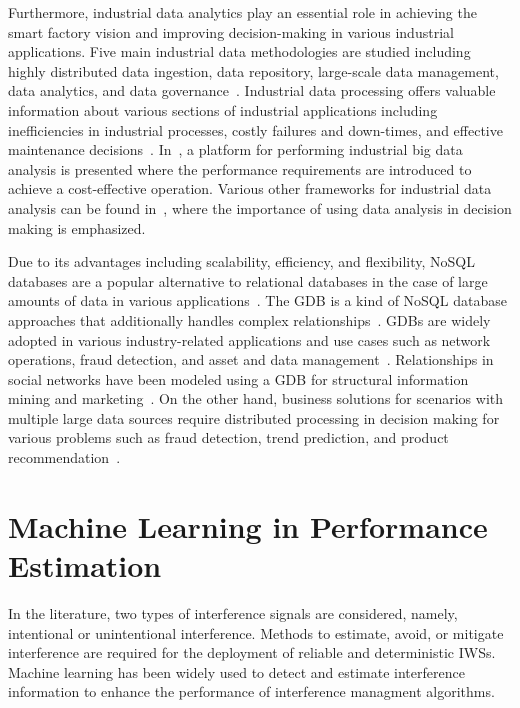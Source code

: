 Furthermore, industrial data analytics play an essential role in achieving the smart factory vision and improving decision-making in various industrial applications. Five main industrial data methodologies are studied including highly distributed data ingestion, data repository, large-scale data management, data analytics, and data governance~\cite{DBLP:journals/corr/abs-1807-01016}. Industrial data processing offers valuable information about various sections of industrial applications including inefficiencies in industrial processes, costly failures and down-times, and effective maintenance decisions~\cite{JLee}. In~\cite{4}, a platform for performing industrial big data analysis is presented where the performance requirements are introduced to achieve a cost-effective operation. Various other frameworks for industrial data analysis can be found in~\cite{5,6}, where the importance of using data analysis in decision making is emphasized.

Due to its advantages including scalability, efficiency, and flexibility, NoSQL databases are a popular alternative to relational databases in the case of large amounts of data in various applications~\cite{doi:10.1108/17440081311316398}. The GDB is a kind of NoSQL database approaches that additionally handles complex relationships~\cite{8123475}. GDBs are widely adopted in various industry-related applications and use cases such as network operations, fraud detection, and asset and data management~\cite{top5}. Relationships in social networks have been modeled using a GDB for structural information mining and marketing~\cite{Gomez-Rodriguez:2012:IND:2086737.2086741}. On the other hand, business solutions for scenarios with multiple large data sources require distributed processing in decision making for various problems such as fraud detection, trend prediction, and product recommendation~\cite{Skhiri2013}.


\chapter{Machine Learning in Performance Estimation}

\chapterintro*

\blindtext

In the literature, two types of interference signals are considered, namely, intentional or unintentional interference. Methods to estimate, avoid, or mitigate interference are required for the deployment of reliable and deterministic IWSs. Machine learning has been widely used to detect and estimate interference information to enhance the performance of interference managment algorithms.  

